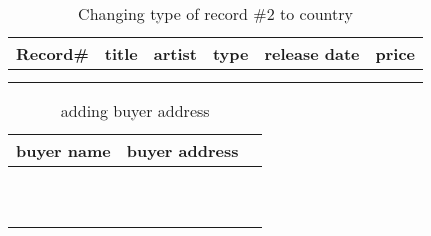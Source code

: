 \documentclass[]{article}
\begin{document}
		\begin{center}
			\begin{longtable}{|c|c|c|c|c|c|}
			\caption{Changing type of record \#2 to country} \\ 
			\hline
			\hline
			Record\# & title & artist & type & release date & price \\ 
			\hline
				\phantom{1} & & & & &  \\
			\hline
				\phantom{1} & & & & &  \\
			\hline
			\hline
			\end{longtable}
		\end{center}

		\begin{center}
			\begin{longtable}{|c|c|c|}
			\caption{adding buyer address} \\ 
			\hline
			\hline
			buyer name & buyer address  \\ 
			\hline
				\phantom{1} &   \\
			\hline
				\phantom{1} &  \\
			\hline
			\phantom{1} &  \\
			\hline
				\phantom{1} &  \\
			\hline
			\phantom{1} &  \\
			\hline
				\phantom{1} &  \\
			\hline
			\phantom{1} &  \\
			\hline
				\phantom{1} &   \\
			\hline
			\phantom{1} &  \\
			\hline
				\phantom{1} &  \\
			\hline
			\hline
			\end{longtable}
		\end{center}
		
\end{document}
